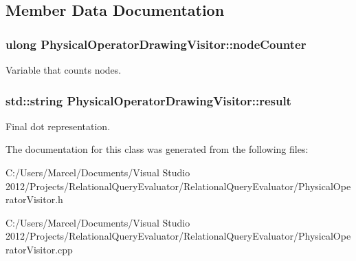 \subsection{Member Data Documentation}
\hypertarget{class_physical_operator_drawing_visitor_a75aa4987d070c40a3ec2e4e9c950c9e0}{
\subsubsection[{node\+Counter}]{\setlength{\rightskip}{0pt plus 5cm}ulong Physical\+Operator\+Drawing\+Visitor\+::node\+Counter}}\label{class_physical_operator_drawing_visitor_a75aa4987d070c40a3ec2e4e9c950c9e0}
Variable that counts nodes. \hypertarget{class_physical_operator_drawing_visitor_a5663f7f6a5c8a6ad25d0c4c8f918123e}{
\subsubsection[{result}]{\setlength{\rightskip}{0pt plus 5cm}std\+::string Physical\+Operator\+Drawing\+Visitor\+::result}}\label{class_physical_operator_drawing_visitor_a5663f7f6a5c8a6ad25d0c4c8f918123e}
Final dot representation. 

The documentation for this class was generated from the following files\+:\begin{DoxyCompactItemize}
\item 
C\+:/\+Users/\+Marcel/\+Documents/\+Visual Studio 2012/\+Projects/\+Relational\+Query\+Evaluator/\+Relational\+Query\+Evaluator/Physical\+Operator\+Visitor.\+h\item 
C\+:/\+Users/\+Marcel/\+Documents/\+Visual Studio 2012/\+Projects/\+Relational\+Query\+Evaluator/\+Relational\+Query\+Evaluator/Physical\+Operator\+Visitor.\+cpp\end{DoxyCompactItemize}
